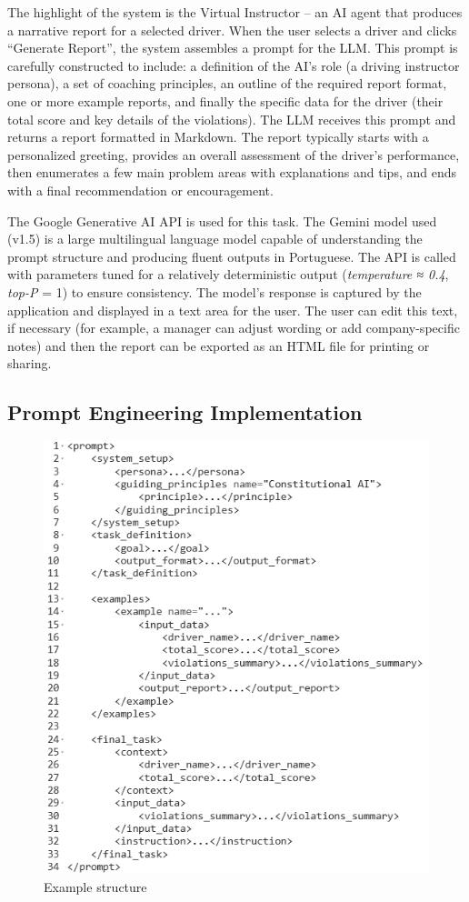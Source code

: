 \documentclass[12pt]{article}
\begin{document}
The highlight of the system is the Virtual Instructor – an AI agent that produces a narrative report for a selected driver. When the user selects a driver and clicks “Generate Report”, the system assembles a prompt for the LLM. This prompt is carefully constructed to include: a definition of the AI’s role (a driving instructor persona), a set of coaching principles, an outline of the required report format, one or more example reports, and finally the specific data for the driver (their total score and key details of the violations). The LLM receives this prompt and returns a report formatted in Markdown. The report typically starts with a personalized greeting, provides an overall assessment of the driver’s performance, then enumerates a few main problem areas with explanations and tips, and ends with a final recommendation or encouragement.

The Google Generative AI API is used for this task. The Gemini model used (v1.5) \cite{google2023} is a large multilingual language model capable of understanding the prompt structure and producing fluent outputs in Portuguese. The API is called with parameters tuned for a relatively deterministic output (\textit{temperature ≈ 0.4}, \textit{top-P} = 1) to ensure consistency. The model’s response is captured by the application and displayed in a text area for the user. The user can edit this text, if necessary (for example, a manager can adjust wording or add company-specific notes) and then the report can be exported as an HTML file for printing or sharing.

\subsection{Prompt Engineering Implementation}

\begin{figure}[ht]
\centering
\includegraphics[width=.4\textwidth]{prompt_black_white.png}
\caption{Example structure}
\label{fig:exampleFig1}
\end{figure}
\end{document}
